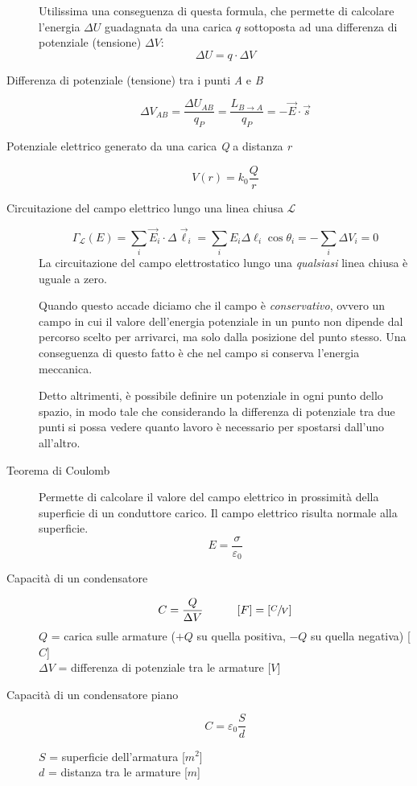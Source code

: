 \documentclass[a4paper,11pt,italian]{article}
\begin{document}
\begin{description}
  Utilissima una conseguenza di questa formula, che permette di calcolare l'energia $ \Delta U $ guadagnata da una carica $ q $ sottoposta ad una differenza di potenziale (tensione) $ \Delta V $:
  \[ \Delta U = q \cdot \Delta V \]
  
  \item[Differenza di potenziale (tensione) tra i punti \textit{A} e \textit{B}]
  \[  \Delta V_{AB} = \frac{\Delta U_{AB}}{q_P} = \frac{L_{B \rightarrow A}}{q_P} = - \vec{E} \cdot \vec{s} \]
  
  \item[Potenziale elettrico generato da una carica \textit{Q} a distanza \textit{r}]
  \[ V(r) = k_0 \frac{Q}{r}  \]
  
  \item[Circuitazione del campo elettrico lungo una linea chiusa  $ \mathscr{L} $]
  \[ \Gamma_\mathscr{L}(E) = \sum_i  \vec{E}_i \cdot \Delta\vec{\ell}_i = \sum_i E_i \Delta \ell_i \cos \theta_i = - \sum_i \Delta V_i = 0 \]
  La circuitazione del campo elettrostatico lungo una \emph{qualsiasi} linea chiusa è uguale a zero.
  
  Quando questo accade diciamo che il campo è \emph{conservativo}, ovvero un campo in cui il valore dell'energia potenziale in un punto non dipende dal percorso scelto per arrivarci, ma solo dalla posizione del punto stesso. Una conseguenza di questo fatto è che nel campo si conserva l'energia meccanica.
  
  Detto altrimenti, è possibile definire un potenziale in ogni punto dello spazio, in modo tale che considerando la differenza di potenziale tra due punti si possa vedere quanto lavoro è necessario per spostarsi dall'uno all'altro. 
  
  \item[Teorema di Coulomb] 
  Permette di calcolare il valore del campo elettrico in prossimità della superficie di un conduttore carico. Il campo elettrico risulta normale alla superficie.
  \[ E = \frac{\sigma}{\varepsilon_0} \]
  
  \item[Capacità di un condensatore]
  \[ C = \frac{Q}{\Delta V} \hspace*{3em} [F] = \left[ \sfrac{C}{V} \right] \]
  $ Q $ = carica sulle armature ($ +Q $ su quella positiva, $ -Q $ su quella negativa) [$ C $]\\
  $ \Delta V $ = differenza di potenziale tra le armature [$ V $]
  
  \item[Capacità di un condensatore piano]
  \[ C = \varepsilon_0 \frac{S}{d} \]
  \begin{multicols}{2}
  $ S $ = superficie dell'armatura [$ m^2 $]\\
  $ d $ = distanza tra le armature [$ m $]
  \end{multicols}
  

\end{description}
\end{document}
